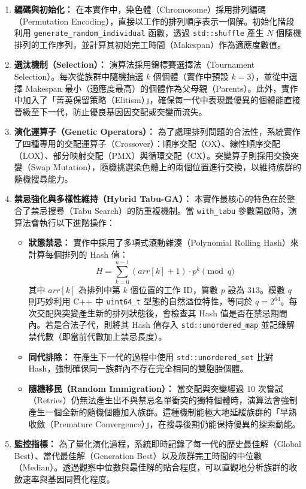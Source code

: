 \documentclass[conference]{IEEEtran}
\begin{document}
\begin{enumerate}
    \item \textbf{編碼與初始化：}
    在本實作中，染色體（Chromosome）採用排列編碼（Permutation Encoding），直接以工作的排列順序表示一個解。初始化階段利用 \texttt{generate\_random\_individual} 函數，透過 \texttt{std::shuffle} 產生 $N$ 個隨機排列的工作序列，並計算其初始完工時間（Makespan）作為適應度數值。

    \item \textbf{選汰機制（Selection）：}
    演算法採用錦標賽選擇法（Tournament Selection）。每次從族群中隨機抽選 $k$ 個個體（實作中預設 $k=3$），並從中選擇 Makespan 最小（適應度最高）的個體作為父母親（Parents）。此外，實作中加入了「菁英保留策略（Elitism）」，確保每一代中表現最優異的個體能直接晉級至下一代，防止優良基因因交配或突變而流失。

    \item \textbf{演化運算子（Genetic Operators）：}
    為了處理排列問題的合法性，系統實作了四種專用的交配運算子（Crossover）：順序交配（OX）、線性順序交配（LOX）、部分映射交配（PMX）與循環交配（CX）。突變算子則採用交換突變（Swap Mutation），隨機挑選染色體上的兩個位置進行交換，以維持族群的隨機搜尋能力。

    \item \textbf{禁忌強化與多樣性維持（Hybrid Tabu-GA）：}
    本實作最核心的特色在於整合了禁忌搜尋（Tabu Search）的防重複機制。當 \texttt{with\_tabu} 參數開啟時，演算法會執行以下進階操作：
    \begin{itemize}
        \item \textbf{狀態禁忌：} 
        實作中採用了多項式滾動雜湊（Polynomial Rolling Hash）來計算每個排列的 Hash 值：
        $$H = \sum_{k=0}^{n-1} (arr[k] + 1) \cdot p^k \pmod q$$
        其中 $arr[k]$ 為排列中第 $k$ 個位置的工作 ID，質數 $p$ 設為 $313$。模數 $q$ 則巧妙利用 C++ 中 \texttt{uint64\_t} 型態的自然溢位特性，等同於 $q = 2^{64}$。每次交配與突變產生新的排列狀態後，會檢查其 Hash 值是否在禁忌期間內。若是合法子代，則將其 Hash 值存入 \texttt{std::unordered\_map} 並記錄解禁代數（即當前代數加上禁忌長度）。


        \item \textbf{同代排除：} 在產生下一代的過程中使用 \texttt{std::unordered\_set} 比對 Hash，強制確保同一族群內不存在完全相同的雙胞胎個體。
        \item \textbf{隨機移民（Random Immigration）：} 當交配與突變經過 10 次嘗試（Retries）仍無法產生出不與禁忌名單衝突的獨特個體時，演算法會強制產生一個全新的隨機個體加入族群。這種機制能極大地延緩族群的「早熟收斂（Premature Convergence）」，在搜尋後期仍能保持優異的探索動能。
    \end{itemize}

    \item \textbf{監控指標：}
    為了量化演化過程，系統即時記錄了每一代的歷史最佳解（Global Best）、當代最佳解（Generation Best）以及族群完工時間的中位數（Median）。透過觀察中位數與最佳解的貼合程度，可以直觀地分析族群的收斂速率與基因同質化程度。


\end{enumerate}
\end{document}
